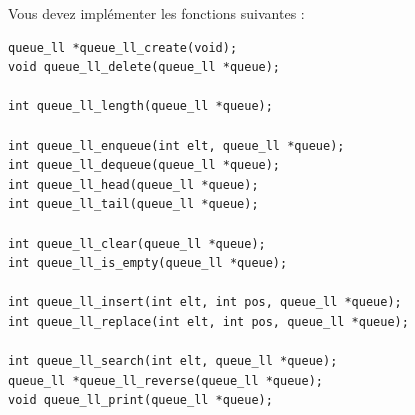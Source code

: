 \newpage


\noindent Vous devez implémenter les fonctions suivantes :

\bigskip

\lstset{language=C}
\begin{lstlisting}[frame=single,title={Liste des fonctions pour une file avec liste chaînée}]
queue_ll *queue_ll_create(void);
void queue_ll_delete(queue_ll *queue);

int queue_ll_length(queue_ll *queue);

int queue_ll_enqueue(int elt, queue_ll *queue);
int queue_ll_dequeue(queue_ll *queue);
int queue_ll_head(queue_ll *queue);
int queue_ll_tail(queue_ll *queue);

int queue_ll_clear(queue_ll *queue);
int queue_ll_is_empty(queue_ll *queue);

int queue_ll_insert(int elt, int pos, queue_ll *queue);
int queue_ll_replace(int elt, int pos, queue_ll *queue);

int queue_ll_search(int elt, queue_ll *queue);
queue_ll *queue_ll_reverse(queue_ll *queue);
void queue_ll_print(queue_ll *queue);
\end{lstlisting}



